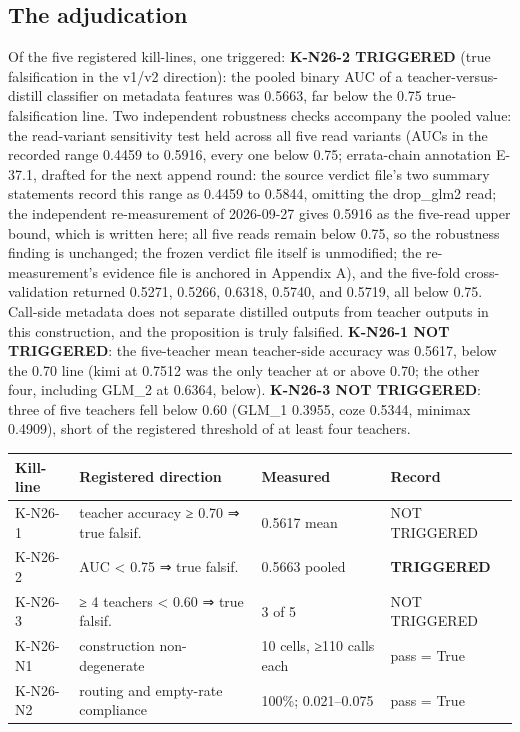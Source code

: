 \documentclass[11pt]{article}
\begin{document}
\subsection{The adjudication}
\noindent Of the five registered kill-lines, one triggered: \textbf{K-N26-2 TRIGGERED} (true falsification in the v1/v2 direction): the pooled binary AUC of a teacher-versus-distill classifier on metadata features was 0.5663, far below the 0.75 true-falsification line. Two independent robustness checks accompany the pooled value: the read-variant sensitivity test held across all five read variants (AUCs in the recorded range 0.4459 to 0.5916, every one below 0.75; errata-chain annotation E-37.1, drafted for the next append round: the source verdict file's two summary statements record this range as 0.4459 to 0.5844, omitting the drop\_glm2 read; the independent re-measurement of 2026-09-27 gives 0.5916 as the five-read upper bound, which is written here; all five reads remain below 0.75, so the robustness finding is unchanged; the frozen verdict file itself is unmodified; the re-measurement's evidence file is anchored in Appendix A), and the five-fold cross-validation returned 0.5271, 0.5266, 0.6318, 0.5740, and 0.5719, all below 0.75. Call-side metadata does not separate distilled outputs from teacher outputs in this construction, and the proposition is truly falsified. \textbf{K-N26-1 NOT TRIGGERED}: the five-teacher mean teacher-side accuracy was 0.5617, below the 0.70 line (kimi at 0.7512 was the only teacher at or above 0.70; the other four, including GLM\_2 at 0.6364, below). \textbf{K-N26-3 NOT TRIGGERED}: three of five teachers fell below 0.60 (GLM\_1 0.3955, coze 0.5344, minimax 0.4909), short of the registered threshold of at least four teachers.\par
\begingroup\small
\noindent\begin{tabularx}{\textwidth}{@{}l >{\raggedright\arraybackslash}X l >{\raggedright\arraybackslash}p{}@{}}
\toprule
\textbf{Kill-line} & \textbf{Registered direction} & \textbf{Measured} & \textbf{Record} \\
\midrule
K-N26-1 & teacher accuracy ≥ 0.70 ⇒ true falsif. & 0.5617 mean & NOT TRIGGERED \\
K-N26-2 & AUC < 0.75 ⇒ true falsif. & 0.5663 pooled & \textbf{TRIGGERED} \\
K-N26-3 & ≥ 4 teachers < 0.60 ⇒ true falsif. & 3 of 5 & NOT TRIGGERED \\
K-N26-N1 & construction non-degenerate & 10 cells, ≥110 calls each & pass = True \\
K-N26-N2 & routing and empty-rate compliance & 100\%; 0.021–0.075 & pass = True \\
\bottomrule
\end{tabularx}
\endgroup
\end{document}
